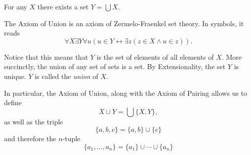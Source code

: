 \documentclass[12pt]{article}
\begin{document}
For any $X$ there exists a set $Y = \bigcup X$.

The Axiom of Union is an axiom of Zermelo-Fraenkel set theory.  In symbols, it reads
\[
\forall X \exists Y \forall u (u \in Y \leftrightarrow \exists z (z \in X \land u \in z)).
\]

Notice that this means that $Y$ is the set of elements of all elements of $X$.  More succinctly, the union of any set of sets is a set.  By Extensionality, the set $Y$ is unique.  $Y$ is called the \emph{union} of $X$.

In particular, the Axiom of Union, along with the Axiom of Pairing allows us to define
\[
X \cup Y = \bigcup \{ X, Y \},
\]
as well as the triple
\[
\{ a, b, c \} = \{ a, b \} \cup \{ c \}
\]
and therefore the $n$-tuple
\[
\{ a_1, \ldots, a_n \} = \{ a_1 \} \cup \cdots \cup \{ a_n \}
\]
\end{document}
